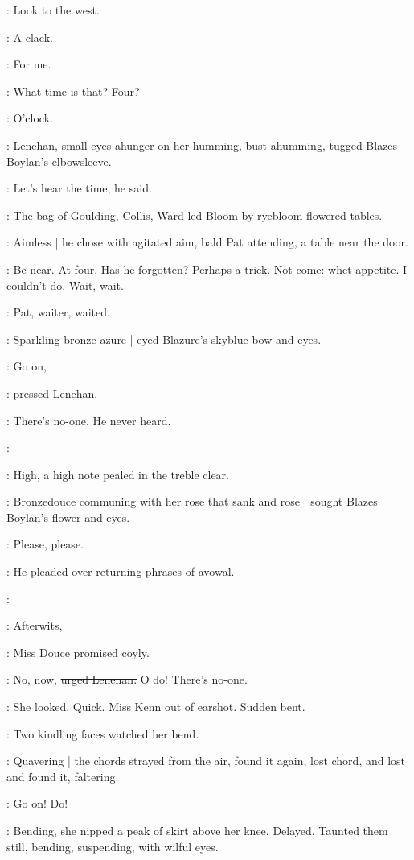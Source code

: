 \BloomInt:
Look to the west.

:
A clack.

\BloomInt:
For me.

\boylan:
What time is that?
Four?

:
O'clock.

:
Lenehan,
small eyes ahunger on her humming,
bust ahumming,
tugged Blazes Boylan's elbowsleeve.

\lenehan:
Let's hear the time,
\sout{he said.}

:
The bag of Goulding, Collis, Ward
led Bloom by ryebloom flowered tables.

:
Aimless |
he chose with agitated aim,
bald Pat attending,
a table near the door.

\BloomInt:
Be near.
At four.
Has he forgotten?
Perhaps a trick.
Not come:
whet appetite.
I couldn't do.
Wait,
wait.

:
Pat,
waiter,
waited.

:
Sparkling bronze azure |
eyed Blazure's skyblue bow and eyes.

\lenehan:
Go on,

:
pressed Lenehan.

\lenehan:
There's no-one.
He never heard.

\simon:

:
High,
a high note pealed in the treble clear.

:
Bronzedouce communing with her rose that sank and rose |
sought Blazes Boylan's flower and eyes.

\lenehan:
Please,
please.

:
He pleaded over returning phrases of avowal.

\simon:

\MissD:
Afterwits,

:
Miss Douce promised coyly.

\lenehan:
No,
now,
\sout{urged Lenehan.}
O do!
There's no-one.

:
She looked.
Quick.
Miss Kenn out of earshot.
Sudden bent.

:
Two kindling faces watched her bend.

:
Quavering |
the chords strayed from the air,
found it again,
lost chord,
and lost and found it,
faltering.

\lenehan:
Go on!
Do!

:
Bending,
she nipped a peak of skirt above her knee.
Delayed.
Taunted them still,
bending,
suspending,
with wilful eyes.

